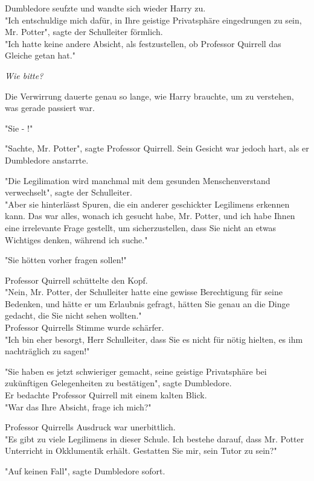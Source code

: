 {Dumbledore seufzte und wandte sich wieder Harry zu.\\ "Ich entschuldige mich dafür, in Ihre geistige Privatsphäre eingedrungen zu sein, Mr. Potter", sagte der Schulleiter förmlich.\\ "Ich hatte keine andere Absicht, als festzustellen, ob Professor Quirrell das Gleiche getan hat."

\emph{Wie bitte?}

Die Verwirrung dauerte genau so lange, wie Harry brauchte, um zu verstehen, was gerade passiert war.

"Sie - !"

"Sachte, Mr. Potter", sagte Professor Quirrell. Sein Gesicht war jedoch hart, als er Dumbledore anstarrte.

"Die Legilimation wird manchmal mit dem gesunden Menschenverstand verwechselt", sagte der Schulleiter.\\ "Aber sie hinterlässt Spuren, die ein anderer geschickter Legilimens erkennen kann. Das war alles, wonach ich gesucht habe, Mr. Potter, und ich habe Ihnen eine irrelevante Frage gestellt, um sicherzustellen, dass Sie nicht an etwas Wichtiges denken, während ich suche."

"Sie hötten vorher fragen sollen!"

Professor Quirrell schüttelte den Kopf.\\ "Nein, Mr. Potter, der Schulleiter hatte eine gewisse Berechtigung für seine Bedenken, und hätte er um Erlaubnis gefragt, hätten Sie genau an die Dinge gedacht, die Sie nicht sehen wollten."\\ Professor Quirrells Stimme wurde schärfer.\\ "Ich bin eher besorgt, Herr Schulleiter, dass Sie es nicht für nötig hielten, es ihm nachträglich zu sagen!"

"Sie haben es jetzt schwieriger gemacht, seine geistige Privatsphäre bei zukünftigen Gelegenheiten zu bestätigen", sagte Dumbledore.\\ Er bedachte Professor Quirrell mit einem kalten Blick.\\ "War das Ihre Absicht, frage ich mich?"

Professor Quirrells Ausdruck war unerbittlich.\\ "Es gibt zu viele Legilimens in dieser Schule. Ich bestehe darauf, dass Mr. Potter Unterricht in Okklumentik erhält. Gestatten Sie mir, sein Tutor zu sein?"

"Auf keinen Fall", sagte Dumbledore sofort.

}
